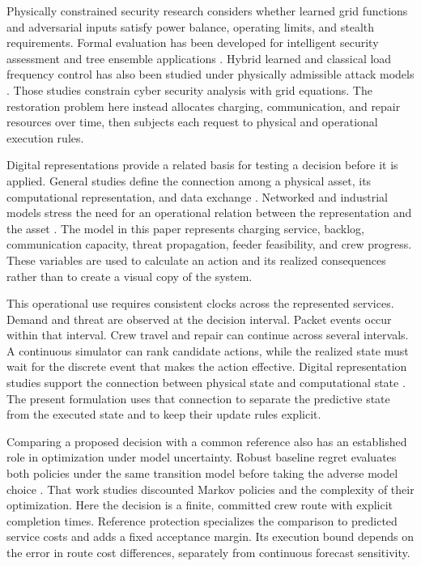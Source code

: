 \documentclass[journal]{IEEEtran}
\begin{document}
Physically constrained security research considers whether learned grid
functions and adversarial inputs satisfy power balance, operating limits, and
stealth requirements.  Formal evaluation has been developed for intelligent
security assessment and tree ensemble applications
\cite{zhang2023robustness,zhang2023datasecurity}.  Hybrid learned and classical
load frequency control has also been studied under physically admissible attack
models \cite{zhang2026physicsattack}.  Those studies constrain cyber security
analysis with grid equations.  The restoration problem here instead allocates
charging, communication, and repair resources over time, then subjects each
request to physical and operational execution rules.

Digital representations provide a related basis for testing a decision before
it is applied.  General studies define the connection among a physical asset,
its computational representation, and data exchange
\cite{tao2019digital,fuller2020digital}.  Networked and industrial models stress
the need for an operational relation between the representation and the asset
\cite{minerva2020digital,ding2021digital}.  The model in this paper represents
charging service, backlog, communication capacity, threat propagation, feeder
feasibility, and crew progress.  These variables are used to calculate an
action and its realized consequences rather than to create a visual copy of the
system.

This operational use requires consistent clocks across the represented
services.  Demand and threat are observed at the decision interval.  Packet
events occur within that interval.  Crew travel and repair can continue across
several intervals.  A continuous simulator can rank candidate actions, while
the realized state must wait for the discrete event that makes the action
effective.  Digital representation studies support the connection between
physical state and computational state \cite{fuller2020digital,
minerva2020digital}.  The present formulation uses that connection to separate
the predictive state from the executed state and to keep their update rules
explicit.

Comparing a proposed decision with a common reference also has an established
role in optimization under model uncertainty.  Robust baseline regret
evaluates both policies under the same transition model before taking the
adverse model choice \cite{petrik2016baseline}.  That work studies discounted
Markov policies and the complexity of their optimization.  Here the decision
is a finite, committed crew route with explicit completion times.  Reference
protection specializes the comparison to predicted service costs and adds a
fixed acceptance margin.  Its execution bound depends on the error in route
cost differences, separately from continuous forecast sensitivity.
\end{document}
